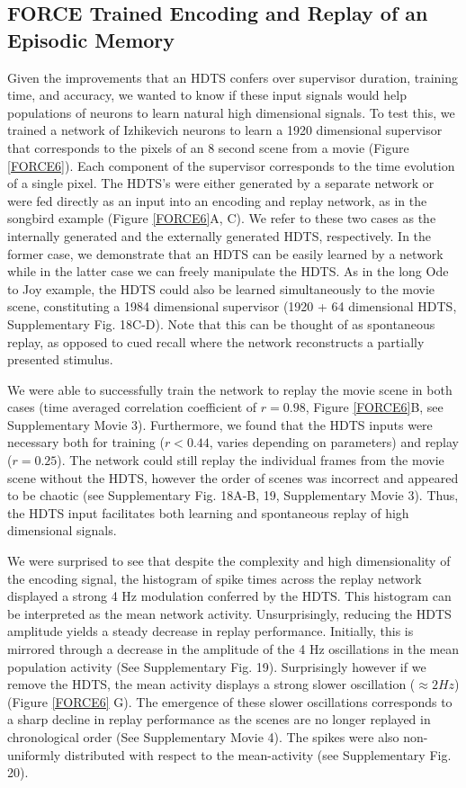 \documentclass[11pt]{article} %
\begin{document}
\subsection*{FORCE Trained Encoding and Replay of an Episodic Memory} 

Given the improvements that an HDTS confers over supervisor duration, training time, and accuracy, we wanted to know if these input signals would help populations of neurons to learn natural high dimensional signals.  To test this, we trained a network of Izhikevich neurons to learn a 1920 dimensional supervisor that corresponds to the pixels of an 8 second scene from a movie (Figure \ref{FORCE6}).  Each component of the supervisor corresponds to the time evolution of a single pixel.  The HDTS's were either generated by a separate network or were fed directly as an input into an encoding and replay network, as in the songbird example (Figure \ref{FORCE6}A, C).   We refer to these two cases as the internally generated and the externally generated HDTS, respectively.   In the former case, we demonstrate that an HDTS can be easily learned by a network while in the latter case we can freely manipulate the HDTS.  As in the long Ode to Joy example, the HDTS could also be learned simultaneously to the movie scene, constituting a 1984 dimensional supervisor (1920 + 64 dimensional HDTS, Supplementary Fig. 18C-D).  Note that this can be thought of as spontaneous replay, as opposed to cued recall where the network reconstructs a partially presented stimulus.  

We were able to successfully train the network to replay the movie scene in both cases (time averaged correlation coefficient of $r = 0.98$, Figure \ref{FORCE6}B, see Supplementary Movie 3).  Furthermore, we found that the HDTS inputs were necessary both for training ($r<0.44$, varies depending on parameters) and replay ($r=0.25$).  The network could still replay the individual frames from the movie scene without the HDTS, however the order of scenes was incorrect and appeared to be chaotic (see Supplementary Fig. 18A-B, 19, Supplementary Movie 3).  Thus, the HDTS input facilitates both learning and spontaneous replay of high dimensional signals.  

We were surprised to see that despite the complexity and high dimensionality of the encoding signal, the histogram of spike times across the replay network displayed a strong 4 Hz modulation conferred by the HDTS.  This histogram can be interpreted as the mean network activity.    Unsurprisingly, reducing the HDTS amplitude yields a steady decrease in replay performance.   Initially, this is mirrored through a decrease in the amplitude of the 4 Hz oscillations in the mean population activity (See Supplementary Fig. 19).  Surprisingly however if we remove the HDTS, the mean activity displays a strong slower oscillation ($\approx 2 Hz$) (Figure \ref{FORCE6} G).  The emergence of these slower oscillations corresponds to a sharp decline in replay performance as the scenes are no longer replayed in chronological order (See Supplementary Movie 4).  The spikes were also non-uniformly distributed with respect to the mean-activity (see Supplementary Fig. 20).  
\end{document}
